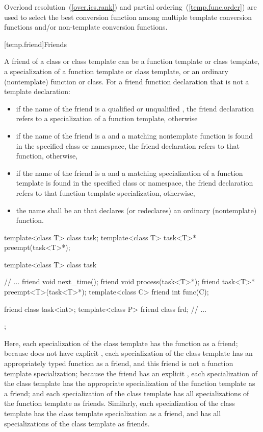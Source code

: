 \pnum
Overload resolution~(\ref{over.ics.rank}) and partial
ordering~(\ref{temp.func.order}) are used to select the best conversion function
among multiple template conversion functions
and/or non-template conversion functions.

[temp.friend]{Friends}

\pnum
{}%
A friend of a class or class template can be a function template or
class template, a specialization of a function template or class
template, or an ordinary (nontemplate) function or class.
For a friend function declaration that is not a template declaration:

\begin{itemize}
\item
if the name of the friend is a qualified or unqualified ,
the friend declaration refers to a specialization of a function
template, otherwise
\item
if the name of the friend is a  and a matching nontemplate
function is found in the specified class or namespace, the friend
declaration refers to that function, otherwise,
\item
if the name of the friend is a  and a matching
specialization of a function template is found in the specified class
or namespace, the friend declaration refers to
that function template specialization, otherwise,
\item
the name shall be an  that declares (or redeclares) an
ordinary (nontemplate) function.
\end{itemize}

\enterexample
\begin{codeblock}
template<class T> class task;
template<class T> task<T>* preempt(task<T>*);

template<class T> class task {
	// ...
	friend void next_time();
	friend void process(task<T>*);
	friend task<T>* preempt<T>(task<T>*);
	template<class C> friend int func(C);

	friend class task<int>;
	template<class P> friend class frd;
	// ...
};
\end{codeblock}

Here,
each specialization of the
class template has the function
as a friend;
because
does not have explicit
,
each specialization of the
class template has an appropriately typed function
as a friend, and this friend is not a function template specialization;
because the friend
has an explicit
,
each specialization of the
class template has the appropriate specialization of the function
template
as a friend;
and each specialization of the
class template has all specializations of the function template
as friends.
Similarly,
each specialization of the
class template has the class template specialization
as a friend, and has all specializations of the class template
as friends.
\exitexampleb

